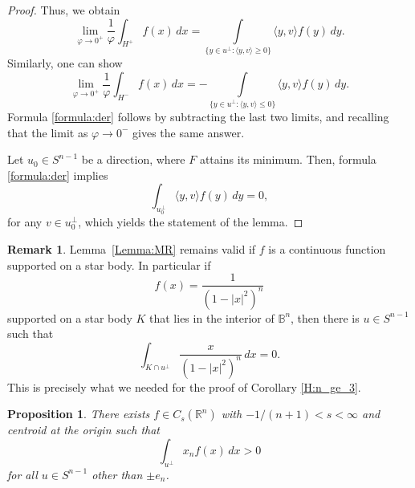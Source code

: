 \documentclass[12pt,letterpaper,reqno]{amsart}
\newtheorem{proposition}[theorem]{Proposition}
\theoremstyle{definition}
\newtheorem{remark}[theorem]{Remark}
\begin{document}
\begin{proof}
						
						
					
						Thus, we obtain
						$$\lim_{\varphi\to 0^+} \frac1{\varphi}	\int_{H^+} f(x) \, dx = \int\limits_{\{ y\in u^\perp:\langle y,v\rangle\ge 0\}} \langle y,v\rangle f(y)\, dy.$$
						Similarly, one can show 
							$$\lim_{\varphi\to 0^+} \frac1{\varphi}	\int_{H^-} f(x) \, dx =  - \int\limits_{\{ y\in u^\perp:\langle y,v\rangle\le 0\}} \langle y,v\rangle f(y)\, dy.$$
						Formula \eqref{formula:der} follows by subtracting the last two limits, and recalling that the limit as $\varphi\to 0^-$ gives the same answer.
							
					 Let $u_0 \in S^{n-1}$ be a direction, where $F$ attains its minimum. Then,   formula \eqref{formula:der} implies
					 $$\int_{u_0^\perp} \langle y,v\rangle f(y) \, dy=0,$$ for any $v\in u_0^\perp$, which yields the statement of the lemma.
					 
			 
				
			\end{proof}
			
					\begin{remark}\label{rem-function}
						Lemma~\ref{Lemma:MR} remains valid if $f$ is a continuous function supported on a star body. In particular if $$f(x) = \frac{1}{(1-|x|^2)^{n}} $$ supported on a star body $K$ that lies in the interior of $\mathbb B^n$, then there is $u\in S^{n-1}$ such that
						$$\int_{K\cap u^\perp}\frac{x}{(1-|x|^2)^{n}}\,dx=0.$$ This is precisely what we needed for the proof of Corollary \ref{H:n_ge_3}.
						
						\end{remark}
			
			\begin{proposition}\label{Main:logconcave}
				There exists   $f\in C_s(\mathbb R^n)$  with $-1/(n+1)<s<\infty$ and  centroid at the origin such that 
					$$
				\int_{u^\perp} x_n f(x) \, dx >0
				$$
				for all $u\in S^{n-1}$ other than $\pm e_n$.
				\end{proposition}
				
\end{document}
